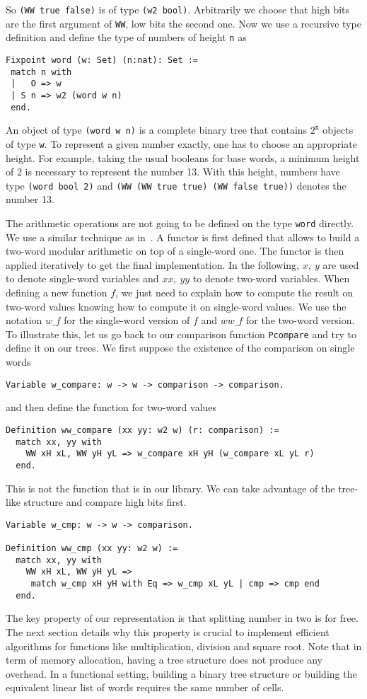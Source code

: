 So {\tt (WW true false)} is of type {\tt (w2 bool)}.
Arbitrarily we choose that high bits are the first argument of {\tt WW}, low bits
the second one. Now we use a recursive type definition and define
the type of numbers of height {\tt n} as
\begin{verbatim}
Fixpoint word (w: Set) (n:nat): Set :=
 match n with
 |   O => w
 | S n => w2 (word w n)
 end.
\end{verbatim}
An object of type {\tt (word w n)} is a complete binary tree that
contains $2^\texttt{n}$ objects of type {\tt w}.
To represent a given number exactly, one has to choose an appropriate height.
For example, taking the usual booleans for base words, a minimum
height of 2 is necessary to represent the number 13. With this height, 
numbers have type {\tt (word bool 2)} and 
{\tt (WW (WW true true) (WW false true))} denotes the number 13.

The arithmetic operations are not going to be defined on the type {\tt word} directly.
We use a similar technique as in~\cite{GreMa}. A functor is first defined that 
allows to build a two-word modular arithmetic on top of a single-word one.
The functor is then applied iteratively to get the final implementation.
In the following, $x,\ y$ are used to denote single-word variables and $xx,\ yy$ 
to denote two-word variables. 
When defining a new function $f$, we just need to explain how to compute the 
result on two-word values knowing how to compute it on single-word values.
We use the notation $w\_f$ for the single-word version of $f$ and 
$ww\_f$ for the two-word version.
To illustrate this, let us go back to our comparison function {\tt Pcompare}
and try to define it on our trees. We first suppose the existence
of the comparison on single words
\begin{verbatim}
Variable w_compare: w -> w -> comparison -> comparison.
\end{verbatim}
and then define the function for two-word values
\begin{verbatim}
Definition ww_compare (xx yy: w2 w) (r: comparison) :=
  match xx, yy with
    WW xH xL, WW yH yL => w_compare xH yH (w_compare xL yL r) 
  end.
\end{verbatim}
This is not the function that is in our library. We can take 
advantage of the tree-like structure and compare high bits first.  
\begin{verbatim}
Variable w_cmp: w -> w -> comparison.

Definition ww_cmp (xx yy: w2 w) :=
  match xx, yy with
    WW xH xL, WW yH yL => 
     match w_cmp xH yH with Eq => w_cmp xL yL | cmp => cmp end
  end. 
\end{verbatim}
The key property of our representation is that splitting number in two
is for free. The next section details why this property is crucial to implement efficient
algorithms for functions like multiplication, division and square root.
Note that in term of memory allocation, having a tree structure
does not produce any overhead. In a functional setting, building a binary 
tree structure or building the equivalent linear list of words requires the same number of cells.

